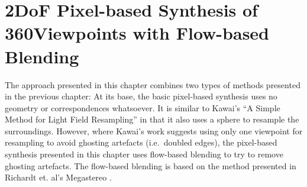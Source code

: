 \chapter{2DoF Pixel-based Synthesis of 360\degree Viewpoints with Flow-based Blending}\label{chap:implementation}


The approach presented in this chapter combines two types of methods presented in the previous chapter: At its base, the basic pixel-based synthesis uses no geometry or correspondences whatsoever. It is similar to Kawai's ``A Simple Method for Light Field Resampling'' \cite{simple_poster} in that it also uses a sphere to resample the surroundings. However, where Kawai's work suggests using only one viewpoint for resampling to avoid ghosting artefacts (i.e.\ doubled edges), the pixel-based synthesis  presented in this chapter uses flow-based blending to try to remove ghosting artefacts. The flow-based blending is based on the method presented in Richardt et. al's Megastereo \cite{megastereo}.

